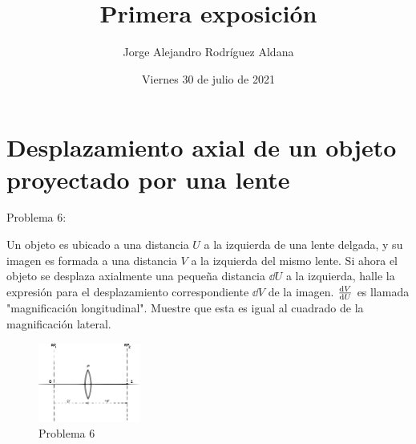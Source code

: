 \documentclass{beamer}
\title{Primera exposición}
\date{Viernes 30 de julio de 2021}
\author{Jorge Alejandro Rodríguez Aldana}
\institute{Escuela de Ciencias Físicas y Matemáticas}
\begin{document}
  \maketitle
  \section{Desplazamiento axial de un objeto proyectado por una lente}
  \begin{frame}{Problema 6:}

    Un objeto es ubicado a una distancia $U$ a la izquierda de una
    lente delgada, y su imagen es formada a una distancia $V$ a la
    izquierda del mismo lente. Si ahora el 
    objeto se desplaza axialmente una pequeña distancia $\dd U$ a la
    izquierda, halle la expresión para el desplazamiento correspondiente
    $\dd V$ de la imagen. $\dv{V}{U}$ es llamada "magnificación longitudinal". 
    Muestre que esta es igual al cuadrado de la magnificación lateral.

    \begin{figure}
        \includegraphics[width=0.3\textwidth]{Figures/Book.png}
        \caption{Problema 6}
        \label{fig-1}
    \end{figure}
  \end{frame}
\end{document}

